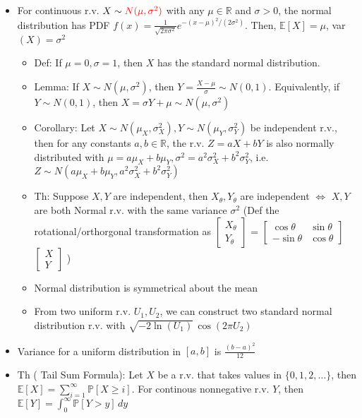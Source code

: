 \documentclass{article}
\begin{document}
\begin{itemize}
	\item For continuous r.v. $X\sim {\color{red} N(\mu, \sigma^2)}$ with any $\mu\in\mathbb{R}$ and $\sigma > 0$, the normal distribution has PDF $f(x) = \frac{1}{\sqrt{2\pi\sigma^2}} e^{-(x-\mu)^2/(2\sigma^2)}$. Then, $\mathbb{E}[X] = \mu$, var$(X) = \sigma^2$
	\begin{itemize}
		\item Def: If $\mu = 0, \sigma = 1$, then $X$ has the standard normal distribution.
		\item Lemma: If $X\sim N(\mu, \sigma^2)$, then $Y = \frac{X-\mu}{\sigma} \sim N(0,1)$. Equivalently, if $Y\sim N(0, 1)$, then $X = \sigma Y + \mu \sim N(\mu, \sigma^2)$
		\item Corollary: Let $X\sim N(\mu_X, \sigma_X^2), Y\sim N(\mu_Y, \sigma_Y^2)$ be independent r.v., then for any constants $a,b\in\mathbb{R}$, the r.v. $Z = aX + bY$ is also normally distributed with $\mu = a\mu_X + b\mu_Y, \sigma^2 = a^2\sigma_X^2 + b^2\sigma_Y^2$, i.e. $Z \sim N(a\mu_X+b\mu_Y, a^2\sigma_X^2+b^2\sigma_Y^2)$
		\item Th: Suppose $X,Y$ are independent, then $X_\theta, Y_\theta$ are independent $\iff$ $X,Y$ are both Normal r.v. with the same variance $\sigma^2$ (Def the rotational/orthorgonal transformation as
		$\begin{bmatrix}
			X_\theta \\ Y_\theta
		\end{bmatrix}$ =
		$\begin{bmatrix}
			\cos\theta & \sin\theta \\
			-\sin\theta & \cos\theta
		\end{bmatrix}$
		$\begin{bmatrix}
			X \\ Y
		\end{bmatrix}$
		)
		\item Normal distribution is symmetrical about the mean
		\item From two uniform r.v. $U_1, U_2$, we can construct two standard normal distribution r.v. with $\sqrt{-2\ln(U_1)}\,\cos(2\pi U_2)$
	\end{itemize}

	\item Variance for a uniform distribution in $[a,b]$ is $\frac{(b-a)^2}{12}$

	\item Th ({\color{red} Tail Sum Formula}): Let $X$ be a r.v. that takes values in $\{0,1,2,\dots\}$, then $\mathbb{E}[X] = \sum\limits_{i=1}^{\infty} \mathbb{P}[X\geq i]$. For continous {\color{blue} nonnegative} r.v. $Y$, then $\mathbb{E}[Y] = \int_0^\infty \mathbb{P}[Y > y]\, dy$
	

\end{itemize}
\end{document}
